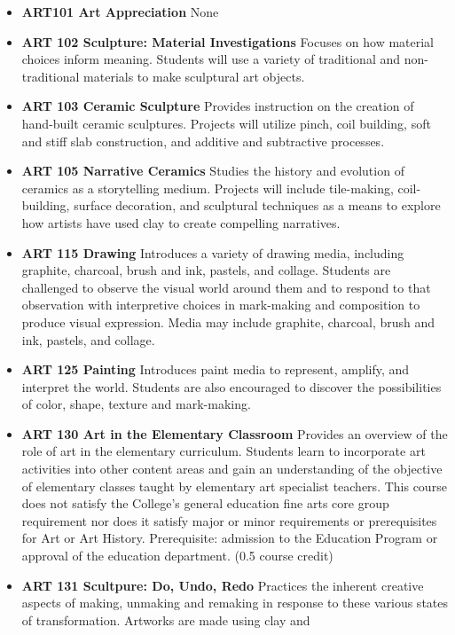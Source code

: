 \documentclass[
  letterpaper,
]{scrbook}
\providecommand{\tightlist}{%
  \setlength{\itemsep}{0pt}\setlength{\parskip}{0pt}}
\begin{document}
\begin{itemize}
\tightlist
\item
  \textbf{ART101 Art Appreciation} None
\item
  \textbf{ART 102 Sculpture: Material Investigations} Focuses on how
  material choices inform meaning. Students will use a variety of
  traditional and non-traditional materials to make sculptural art
  objects.
\item
  \textbf{ART 103 Ceramic Sculpture} Provides instruction on the
  creation of hand-built ceramic sculptures. Projects will utilize
  pinch, coil building, soft and stiff slab construction, and additive
  and subtractive processes.
\item
  \textbf{ART 105 Narrative Ceramics} Studies the history and evolution
  of ceramics as a storytelling medium. Projects will include
  tile-making, coil-building, surface decoration, and sculptural
  techniques as a means to explore how artists have used clay to create
  compelling narratives.
\item
  \textbf{ART 115 Drawing} Introduces a variety of drawing media,
  including graphite, charcoal, brush and ink, pastels, and collage.
  Students are challenged to observe the visual world around them and to
  respond to that observation with interpretive choices in mark-making
  and composition to produce visual expression. Media may include
  graphite, charcoal, brush and ink, pastels, and collage.
\item
  \textbf{ART 125 Painting} Introduces paint media to represent,
  amplify, and interpret the world. Students are also encouraged to
  discover the possibilities of color, shape, texture and mark-making.
\item
  \textbf{ART 130 Art in the Elementary Classroom} Provides an overview
  of the role of art in the elementary curriculum. Students learn to
  incorporate art activities into other content areas and gain an
  understanding of the objective of elementary classes taught by
  elementary art specialist teachers. This course does not satisfy the
  College's general education fine arts core group requirement nor does
  it satisfy major or minor requirements or prerequisites for Art or Art
  History. Prerequisite: admission to the Education Program or approval
  of the education department. (0.5 course credit)
\item
  \textbf{ART 131 Scultpure: Do, Undo, Redo} Practices the inherent
  creative aspects of making, unmaking and remaking in response to these
  various states of transformation. Artworks are made using clay and

\end{itemize}
\end{document}
